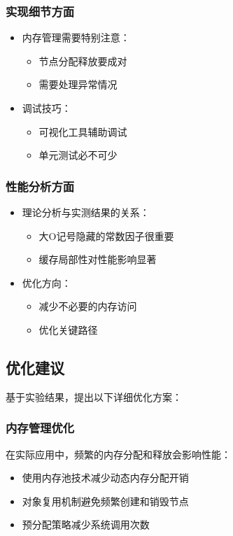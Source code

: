 \documentclass[12pt,a4paper]{article}
\begin{document}
\subsubsection{实现细节方面}
\begin{itemize}
\item 内存管理需要特别注意：
  \begin{itemize}
  \item 节点分配释放要成对
  \item 需要处理异常情况
  \end{itemize}
\item 调试技巧：
  \begin{itemize}
  \item 可视化工具辅助调试
  \item 单元测试必不可少
  \end{itemize}
\end{itemize}

\subsubsection{性能分析方面}
\begin{itemize}
\item 理论分析与实测结果的关系：
  \begin{itemize}
  \item 大O记号隐藏的常数因子很重要
  \item 缓存局部性对性能影响显著
  \end{itemize}
\item 优化方向：
  \begin{itemize}
  \item 减少不必要的内存访问
  \item 优化关键路径
  \end{itemize}
\end{itemize}

\subsection{优化建议}
基于实验结果，提出以下详细优化方案：

\subsubsection{内存管理优化}
在实际应用中，频繁的内存分配和释放会影响性能：
\begin{itemize}
\item 使用内存池技术减少动态内存分配开销
\item 对象复用机制避免频繁创建和销毁节点
\item 预分配策略减少系统调用次数
\end{itemize}
\end{document}
